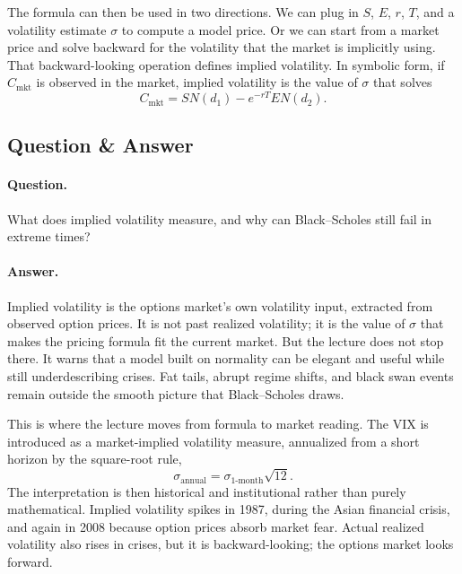 The formula can then be used in two directions. We can plug in $S$, $E$, $r$, $T$, and a volatility estimate $\sigma$ to compute a model price. Or we can start from a market price and solve backward for the volatility that the market is implicitly using. That backward-looking operation defines implied volatility. In symbolic form, if $C_{\text{mkt}}$ is observed in the market, implied volatility is the value of $\sigma$ that solves
\begin{equation}
C_{\text{mkt}}=SN(d_1)-e^{-rT}EN(d_2).
\end{equation}

\subsection{Question \& Answer}

\paragraph{Question.} What does implied volatility measure, and why can Black--Scholes still fail in extreme times?

\paragraph{Answer.} Implied volatility is the options market's own volatility input, extracted from observed option prices. It is not past realized volatility; it is the value of $\sigma$ that makes the pricing formula fit the current market. But the lecture does not stop there. It warns that a model built on normality can be elegant and useful while still underdescribing crises. Fat tails, abrupt regime shifts, and black swan events remain outside the smooth picture that Black--Scholes draws.

This is where the lecture moves from formula to market reading. The VIX is introduced as a market-implied volatility measure, annualized from a short horizon by the square-root rule,
\begin{equation}
\sigma_{\text{annual}}=\sigma_{\text{1-month}}\sqrt{12}.
\end{equation}
The interpretation is then historical and institutional rather than purely mathematical. Implied volatility spikes in 1987, during the Asian financial crisis, and again in 2008 because option prices absorb market fear. Actual realized volatility also rises in crises, but it is backward-looking; the options market looks forward.

